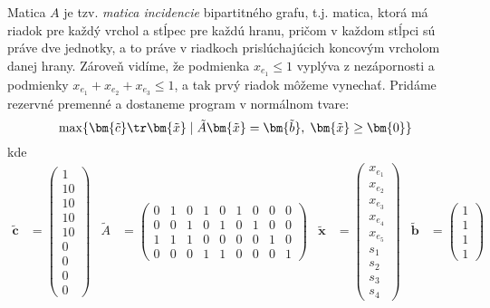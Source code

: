 Matica $A$ je tzv. {\em
matica incidencie} bipartitného grafu, t.j. matica, ktorá má riadok pre každý
vrchol a stĺpec pre každú hranu, pričom v každom stĺpci sú práve dve jednotky,
a to práve v riadkoch prislúchajúcich koncovým vrcholom danej hrany.
Zároveň vidíme, že  podmienka $x_{e_1}\le1$
vyplýva z nezápornosti a podmienky $x_{e_1}+x_{e_2}+x_{e_3}\le1$, a tak prvý riadok môžeme vynechať.
Pridáme rezervné premenné a dostaneme program v normálnom tvare:
\begin{equation}
  \label{eq:ILPa:3}
  \max\{\bm{\tilde{c}}\tr\bm{\tilde{x}}\mid \tilde{A}\bm{\tilde{x}}=\bm{\tilde{b}},\;\bm{\tilde{x}}\ge\bm{0}\}
\end{equation}
kde
\begin{align*}
\bm{\tilde{c}}&=\left(\begin{array}{c}1\\10\\10\\10\\10\\0\\0\\0\\0\end{array}\right)&
\tilde{A}&=\left(\begin{array}{ccccccccc}0&1&0&1&0&1&0&0&0\\0&0&1&0&1&0&1&0&0\\1&1&1&0&0&0&0&1&0\\0&0&0&1&1&0&0&0&1\end{array}\right)&
\bm{\tilde{x}}&=\left(\begin{array}{c}x_{e_1}\\x_{e_2}\\x_{e_3}\\x_{e_4}\\x_{e_5}\\s_1\\s_2\\s_3\\s_4\end{array}\right)&
\bm{\tilde{b}}&=\left(\begin{array}{c}1\\1\\1\\1\end{array}\right)
\end{align*}

